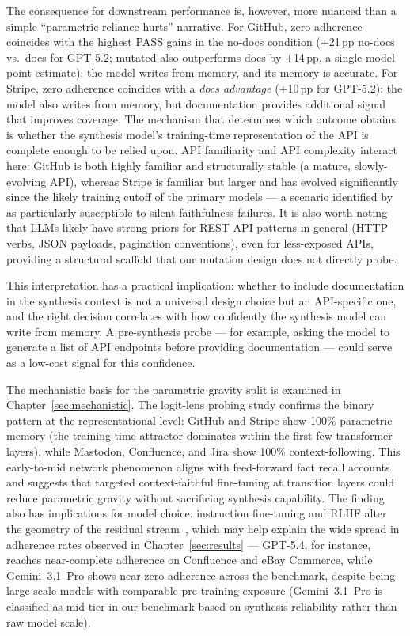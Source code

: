 The consequence for downstream performance is, however, more nuanced than a simple ``parametric reliance hurts'' narrative. For GitHub, zero adherence coincides with the highest PASS gains in the no-docs condition ($+$21\,pp no-docs vs.\ docs for GPT-5.2; mutated also outperforms docs by $+$14\,pp, a single-model point estimate): the model writes from memory, and its memory is accurate. For Stripe, zero adherence coincides with a \emph{docs advantage} (+10\,pp for GPT-5.2): the model also writes from memory, but documentation provides additional signal that improves coverage. The mechanism that determines which outcome obtains is whether the synthesis model's training-time representation of the API is complete enough to be relied upon. API familiarity and API complexity interact here: GitHub is both highly familiar and structurally stable (a mature, slowly-evolving API), whereas Stripe is familiar but larger and has evolved significantly since the likely training cutoff of the primary models --- a scenario identified by \citet{lagging2025} as particularly susceptible to silent faithfulness failures. It is also worth noting that LLMs likely have strong priors for REST API patterns in general (HTTP verbs, JSON payloads, pagination conventions), even for less-exposed APIs, providing a structural scaffold that our mutation design does not directly probe.

This interpretation has a practical implication: whether to include documentation in the synthesis context is not a universal design choice but an API-specific one, and the right decision correlates with how confidently the synthesis model can write from memory. A pre-synthesis probe --- for example, asking the model to generate a list of API endpoints before providing documentation --- could serve as a low-cost signal for this confidence.

The mechanistic basis for the parametric gravity split is examined in Chapter~\ref{sec:mechanistic}. The logit-lens probing study confirms the binary pattern at the representational level: GitHub and Stripe show 100\% parametric memory (the training-time attractor dominates within the first few transformer layers), while Mastodon, Confluence, and Jira show 100\% context-following. This early-to-mid network phenomenon aligns with feed-forward fact recall accounts~\citep{meng2022rome,factualrecall2025} and suggests that targeted context-faithful fine-tuning at transition layers could reduce parametric gravity without sacrificing synthesis capability. The finding also has implications for model choice: instruction fine-tuning and RLHF alter the geometry of the residual stream~\citep{posttrainingreshapes2025}, which may help explain the wide spread in adherence rates observed in Chapter~\ref{sec:results} --- GPT-5.4, for instance, reaches near-complete adherence on Confluence and eBay Commerce, while Gemini~3.1~Pro shows near-zero adherence across the benchmark, despite being large-scale models with comparable pre-training exposure (Gemini~3.1~Pro is classified as mid-tier in our benchmark based on synthesis reliability rather than raw model scale).

